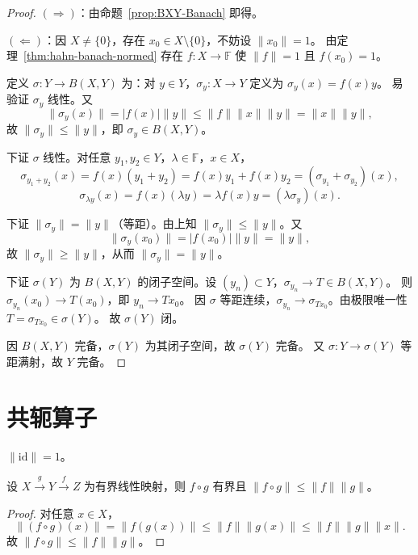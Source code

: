 \documentclass[lang=cn,a4paper,newtx,section]{elegantbook}
\begin{document}
\begin{proof}
  $(\Rightarrow)$：由命题~\ref{prop:BXY-Banach} 即得。

  $(\Leftarrow)$：因 $X\ne\{0\}$，存在 $x_0\in X\setminus\{0\}$，不妨设 $\|x_0\|=1$。
  由定理~\ref{thm:hahn-banach-normed} 存在 $f:X\to\mathbb{F}$ 使 $\|f\|=1$ 且 $f(x_0)=1$。

  定义 $\sigma:Y\to B(X,Y)$ 为：对 $y\in Y$，$\sigma_y:X\to Y$ 定义为 $\sigma_y(x)=f(x)y$。
  易验证 $\sigma_y$ 线性。又
  \[
    \|\sigma_y(x)\|=|f(x)|\|y\|\le\|f\|\|x\|\|y\|=\|x\|\|y\|,
  \]
  故 $\|\sigma_y\|\le\|y\|$，即 $\sigma_y\in B(X,Y)$。

  下证 $\sigma$ 线性。对任意 $y_1,y_2\in Y$，$\lambda\in\mathbb{F}$，$x\in X$，
  \[
    \sigma_{y_1+y_2}(x)=f(x)(y_1+y_2)=f(x)y_1+f(x)y_2=(\sigma_{y_1}+\sigma_{y_2})(x),
  \]
  \[
    \sigma_{\lambda y}(x)=f(x)(\lambda y)=\lambda f(x)y=(\lambda\sigma_y)(x).
  \]

  下证 $\|\sigma_y\|=\|y\|$（等距）。由上知 $\|\sigma_y\|\le\|y\|$。又
  \[
    \|\sigma_y(x_0)\|=|f(x_0)|\|y\|=\|y\|,
  \]
  故 $\|\sigma_y\|\ge\|y\|$，从而 $\|\sigma_y\|=\|y\|$。

  下证 $\sigma(Y)$ 为 $B(X,Y)$ 的闭子空间。设 $(y_n)\subset Y$，$\sigma_{y_n}\to T\in B(X,Y)$。
  则 $\sigma_{y_n}(x_0)\to T(x_0)$，即 $y_n\to Tx_0$。
  因 $\sigma$ 等距连续，$\sigma_{y_n}\to\sigma_{Tx_0}$。由极限唯一性 $T=\sigma_{Tx_0}\in\sigma(Y)$。
  故 $\sigma(Y)$ 闭。

  因 $B(X,Y)$ 完备，$\sigma(Y)$ 为其闭子空间，故 $\sigma(Y)$ 完备。
  又 $\sigma:Y\to\sigma(Y)$ 等距满射，故 $Y$ 完备。
\end{proof}

\section{共轭算子}

\begin{remark}
  $\|\mathrm{id}\|=1$。
\end{remark}

\begin{proposition}
  设 $X\xrightarrow{g}Y\xrightarrow{f}Z$ 为有界线性映射，则 $f\circ g$ 有界且 $\|f\circ g\|\le\|f\|\|g\|$。
\end{proposition}

\begin{proof}
  对任意 $x\in X$，
  \[
    \|(f\circ g)(x)\|=\|f(g(x))\|\le\|f\|\|g(x)\|\le\|f\|\|g\|\|x\|.
  \]
  故 $\|f\circ g\|\le\|f\|\|g\|$。
\end{proof}
\end{document}
